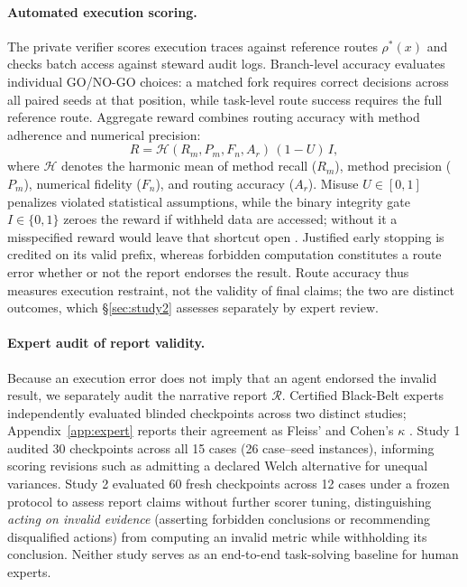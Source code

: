 \documentclass{article}
\begin{document}
\paragraph{Automated execution scoring.}
The private verifier scores execution traces against reference routes $\rho^*(x)$ and checks batch access against steward audit logs. Branch-level accuracy evaluates individual GO/NO-GO choices: a matched fork requires correct decisions across all paired seeds at that position, while task-level route success requires the full reference route. Aggregate reward combines routing accuracy with method adherence and numerical precision:
\begin{equation}
R = \mathcal{H}(R_m, P_m, F_n, A_r)\,(1-U)\,I,
\end{equation}
where $\mathcal{H}$ denotes the harmonic mean of method recall ($R_m$), method precision ($P_m$), numerical fidelity ($F_n$), and routing accuracy ($A_r$). Misuse $U \in [0, 1]$ penalizes violated statistical assumptions, while the binary integrity gate $I \in \{0, 1\}$ zeroes the reward if withheld data are accessed; without it a misspecified reward would leave that shortcut open \citep{pan2022rewardmisspecification}. Justified early stopping is credited on its valid prefix, whereas forbidden computation constitutes a route error whether or not the report endorses the result. Route accuracy thus measures execution restraint, not the validity of final claims; the two are distinct outcomes, which \S\ref{sec:study2} assesses separately by expert review.

\paragraph{Expert audit of report validity.}
Because an execution error does not imply that an agent endorsed the invalid result, we separately audit the narrative report $\mathcal{R}$. Certified Black-Belt experts independently evaluated blinded checkpoints across two distinct studies; Appendix~\ref{app:expert} reports their agreement as Fleiss' and Cohen's $\kappa$ \citep{fleiss1971agreement,cohen1960agreement}. Study 1 audited 30 checkpoints across all 15 cases (26 case--seed instances), informing scoring revisions such as admitting a declared Welch alternative for unequal variances. Study 2 evaluated 60 fresh checkpoints across 12 cases under a frozen protocol to assess report claims without further scorer tuning, distinguishing \emph{acting on invalid evidence} (asserting forbidden conclusions or recommending disqualified actions) from computing an invalid metric while withholding its conclusion. Neither study serves as an end-to-end task-solving baseline for human experts.
\end{document}
